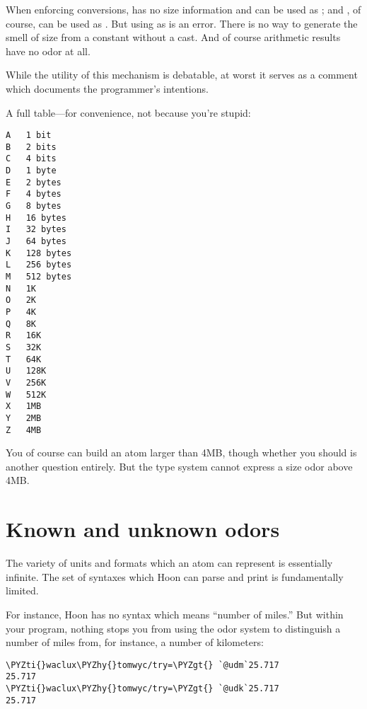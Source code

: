 When enforcing conversions,  has no size information and can
be used as ; and , of course, can be used as .  But
using  as  is an error.  There is no way to generate
the smell of size from a constant without a cast.  And of course
arithmetic results have no odor at all.

While the utility of this mechanism is debatable, at worst it
serves as a comment which documents the programmer's intentions.

A full table---for convenience, not because you're stupid:

\begin{framed_shaded}
\begin{Verbatim}[fontsize=\relsize{-2.5},fontseries=b,commandchars=\\\{\}]
A   1 bit
B   2 bits
C   4 bits
D   1 byte
E   2 bytes
F   4 bytes
G   8 bytes
H   16 bytes
I   32 bytes
J   64 bytes
K   128 bytes
L   256 bytes
M   512 bytes
N   1K
O   2K
P   4K
Q   8K
R   16K
S   32K
T   64K
U   128K
V   256K
W   512K
X   1MB
Y   2MB
Z   4MB
\end{Verbatim}
\end{framed_shaded}

You of course can build an atom larger than 4MB, though whether
you should is another question entirely.  But the type system
cannot express a size odor above 4MB.

\section{Known and unknown odors}

The variety of units and formats which an atom can represent is
essentially infinite.  The set of syntaxes which Hoon can parse
and print is fundamentally limited.

For instance, Hoon has no syntax which means ``number of miles.''
But within your program, nothing stops you from using the odor
system to distinguish a number of miles from, for instance, a
number of kilometers:

\begin{framed_shaded}
\begin{Verbatim}[fontsize=\relsize{-2.5},fontseries=b,commandchars=\\\{\}]
\PYZti{}waclux\PYZhy{}tomwyc/try=\PYZgt{} `@udm`25.717
25.717
\PYZti{}waclux\PYZhy{}tomwyc/try=\PYZgt{} `@udk`25.717
25.717
\end{Verbatim}
\end{framed_shaded}

